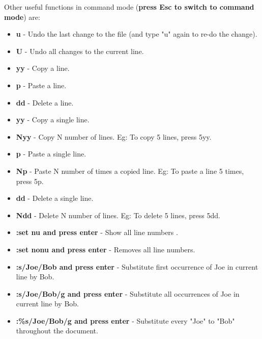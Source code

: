 
\begin{flushleft}
	
	
	\bigskip
	Other useful functions in command mode (\textbf{press Esc to switch to command mode}) are:
	\begin{itemize}
		\item \textbf{u} - Undo the last change to the file (and type "u" again to re-do the change).
		\item \textbf{U} - Undo all changes to the current line.
		\item \textbf{yy} - Copy a line.
		\item \textbf{p} - Paste a line.
		\item \textbf{dd} - Delete a line.
		\item \textbf{yy} - Copy a single line.
		\item \textbf{Nyy} - Copy N number of lines. Eg: To copy 5 lines, press 5yy.
		\item \textbf{p} - Paste a single line.
		\item \textbf{Np} - Paste N number of times a copied line. Eg: To paste a line 5 times, press 5p.
		\item \textbf{dd} - Delete a single line.
		\item \textbf{Ndd} - Delete N number of lines. Eg: To delete 5 lines, press 5dd.
		\item \textbf{:set nu and press enter} - Show all line numbers .
		\item \textbf{:set nonu and press enter} - Removes all line numbers.
		\item \textbf{:s/Joe/Bob and press enter} - Substitute first occurrence of Joe in current line by Bob.
		\item \textbf{:s/Joe/Bob/g and press enter} - Substitute all occurrences of Joe in current line by Bob.
		\item \textbf{:\%s/Joe/Bob/g and press enter} - Substitute every "Joe" to "Bob" throughout the
		document.
	\end{itemize}
	
\end{flushleft}
\newpage